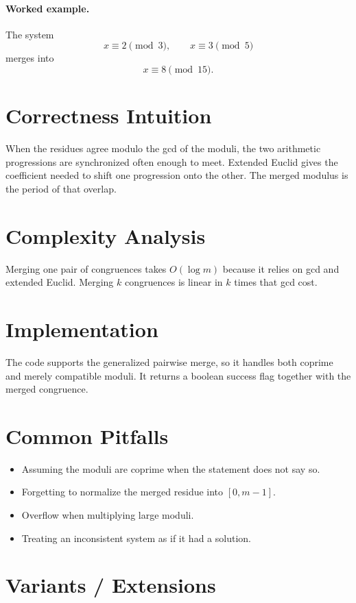 \paragraph{Worked example.}
The system
\[
x \equiv 2 \pmod 3, \qquad x \equiv 3 \pmod 5
\]
merges into
\[
x \equiv 8 \pmod{15}.
\]

\section*{Correctness Intuition}

When the residues agree modulo the gcd of the moduli, the two arithmetic progressions are synchronized often enough to
meet. Extended Euclid gives the coefficient needed to shift one progression onto the other. The merged modulus is the
period of that overlap.

\section*{Complexity Analysis}

Merging one pair of congruences takes \(O(\log m)\) because it relies on gcd and extended Euclid. Merging \(k\)
congruences is linear in \(k\) times that gcd cost.

\section*{Implementation}

The code supports the generalized pairwise merge, so it handles both coprime and merely compatible moduli. It returns a
boolean success flag together with the merged congruence.

\section*{Common Pitfalls}

\begin{itemize}
  \item Assuming the moduli are coprime when the statement does not say so.
  \item Forgetting to normalize the merged residue into \([0, m-1]\).
  \item Overflow when multiplying large moduli.
  \item Treating an inconsistent system as if it had a solution.
\end{itemize}

\section*{Variants / Extensions}

